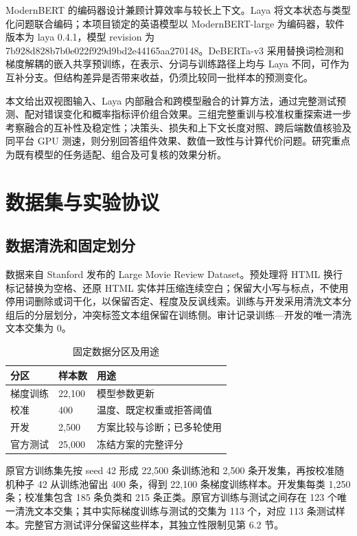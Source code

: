 \documentclass[UTF8,fontset=fandol,a4paper,11pt]{ctexart}
\begin{document}
ModernBERT 的编码器设计兼顾计算效率与较长上下文\cite{modernbert}。Laya 将文本状态与类型化问题联合编码\cite{laya}；本项目锁定的英语模型以 ModernBERT-large 为编码器，软件版本为 laya 0.4.1，模型 revision 为 7b928d828b7b0e022f929d9bd2e44165aa270148。DeBERTa-v3 采用替换词检测和梯度解耦的嵌入共享预训练\cite{deberta}，在表示、分词与训练路径上均与 Laya 不同，可作为互补分支。但结构差异是否带来收益，仍须比较同一批样本的预测变化。

本文给出双视图输入、Laya 内部融合和跨模型融合的计算方法，通过完整测试预测、配对错误变化和概率指标评价组合效果。三组完整重训与校准权重探索进一步考察融合的互补性及稳定性；决策头、损失和上下文长度对照、跨后端数值核验及同平台 GPU 测速，则分别回答组件效果、数值一致性与计算代价问题。研究重点为既有模型的任务适配、组合及可复核的效果分析。

\section{数据集与实验协议}
\subsection{数据清洗和固定划分}
数据来自 Stanford 发布的 Large Movie Review Dataset\cite{maas}。预处理将 HTML 换行标记替换为空格、还原 HTML 实体并压缩连续空白；保留大小写与标点，不使用停用词删除或词干化，以保留否定、程度及反讽线索。训练与开发采用清洗文本分组后的分层划分，冲突标签文本组保留在训练侧。审计记录训练—开发的唯一清洗文本交集为 0。

\begin{table}[htbp]\centering\caption{固定数据分区及用途}\label{tab:t1}\small\renewcommand{\arraystretch}{1.25}
\begin{tabularx}{\linewidth}{YYY}\toprule
\textbf{分区} & \textbf{样本数} & \textbf{用途}\\\midrule
梯度训练 & 22,100 & 模型参数更新\\
校准 & 400 & 温度、既定权重或拒答阈值\\
开发 & 2,500 & 方案比较与诊断；已多轮使用\\
官方测试 & 25,000 & 冻结方案的完整评分\\
\bottomrule\end{tabularx}\end{table}
原官方训练集先按 seed 42 形成 22,500 条训练池和 2,500 条开发集，再按校准随机种子 42 从训练池留出 400 条，得到 22,100 条梯度训练样本。开发集每类 1,250 条；校准集包含 185 条负类和 215 条正类。原官方训练与测试之间存在 123 个唯一清洗文本交集；其中实际梯度训练与测试的交集为 113 个，对应 113 条测试样本。完整官方测试评分保留这些样本，其独立性限制见第 6.2 节。
\end{document}
